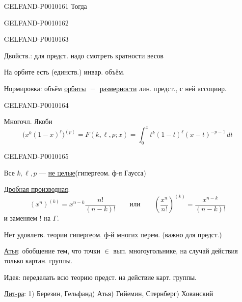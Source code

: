 \begin{GelfandAdjacentEvidence}{GELFAND-P001016}{1}
Тогда
\end{GelfandAdjacentEvidence}
\begin{GelfandAdjacentEvidence}{GELFAND-P001016}{2}


\end{GelfandAdjacentEvidence}
\begin{GelfandAdjacentEvidence}{GELFAND-P001016}{3}


Двойств.: для предст. надо смотреть кратности весов

На орбите есть (единств.) инвар. объём.

Нормировка: объём \underline{орбиты} $=$ \underline{размерности} лин. предст., с ней ассоциир.
\end{GelfandAdjacentEvidence}
\begin{GelfandAdjacentEvidence}{GELFAND-P001016}{4}


Многочл. Якоби
\[
\bigl(x^k(1-x)^\ell\bigr)^{(p)}=F(k,\ell,p;x)
=\int_0^x t^k(1-t)^\ell(x-t)^{-p-1}\,dt
\]
\end{GelfandAdjacentEvidence}
\begin{GelfandAdjacentEvidence}{GELFAND-P001016}{5}


Все $k,\ell,p$ --- \underline{не целые}\qquad (гипергеом. ф-я Гаусса)

\underline{Дробная производная}:
\[
(x^n)^{(k)}=x^{n-k}\frac{n!}{(n-k)!}
\qquad\text{или}\qquad
\left(\frac{x^n}{n!}\right)^{(k)}=\frac{x^{n-k}}{(n-k)!}
\]
и заменяем $!$ на $\Gamma$.

Нет удовлетв. теории \underline{гипергеом. ф-й многих} перем. (важно для предст.)

\underline{Атья}: обобщение тем, что точки $\in$ вып. многоугольнике, на случай действия только картан. группы.

Идея: переделать всю теорию предст. на действие карт. группы.

\underline{Лит-ра}: 1) Березин, Гельфанд) Атья) Гийемин, Стернберг) Хованский

\end{GelfandAdjacentEvidence}




